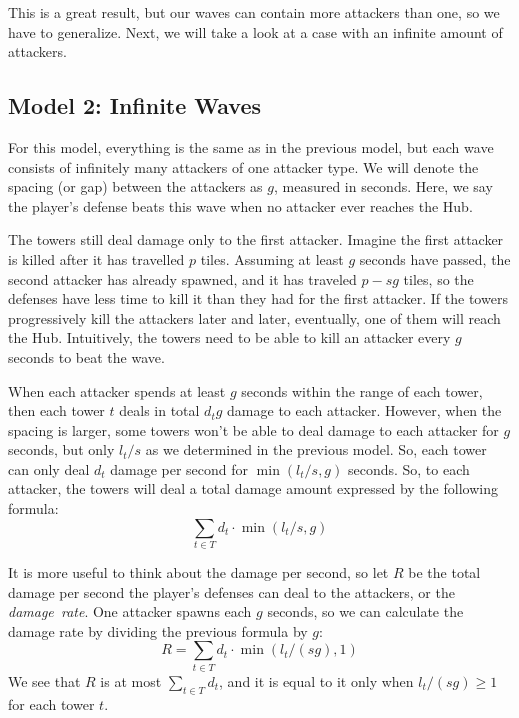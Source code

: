This is a great result, but our waves can contain more attackers than one, so we have to generalize.
Next, we will take a look at a case with an infinite amount of attackers.

\subsection{Model 2: Infinite Waves}
For this model, everything is the same as in the previous model, but each wave consists of infinitely many attackers of one attacker type.
We will denote the spacing (or gap) between the attackers as $g$, measured in seconds.
Here, we say the player's defense beats this wave when no attacker ever reaches the Hub.

The towers still deal damage only to the first attacker.
Imagine the first attacker is killed after it has travelled $p$ tiles.
Assuming at least $g$ seconds have passed, the second attacker has already spawned, and it has traveled $p - sg$ tiles, so the defenses have less time to kill it than they had for the first attacker.
If the towers progressively kill the attackers later and later, eventually, one of them will reach the Hub.
Intuitively, the towers need to be able to kill an attacker every $g$ seconds to beat the wave.

When each attacker spends at least $g$ seconds within the range of each tower, then each tower $t$ deals in total $d_t g$ damage to each attacker.
However, when the spacing is larger, some towers won't be able to deal damage to each attacker for $g$ seconds, but only $l_t / s$ as we determined in the previous model.
So, each tower can only deal $d_t$ damage per second for $\min(l_t / s, g)$ seconds.
So, to each attacker, the towers will deal a total damage amount expressed by the following formula:
\begin{equation}
    \sum_{t \in T} d_t \cdot \min(l_t / s, g)
\end{equation}

It is more useful to think about the damage per second, so let $R$ be the total damage per second the player's defenses can deal to the attackers, or the \emph{damage~rate}.
One attacker spawns each $g$ seconds, so we can calculate the damage rate by dividing the previous formula by $g$:
\begin{equation}\label{eqn:R}
    R = \sum_{t \in T} d_t \cdot \min(l_t / (s g), 1)
\end{equation}
We see that $R$ is at most $\sum_{t \in T} d_t$, and it is equal to it only when $l_t / (s g) \geq 1$ for each tower $t$.

